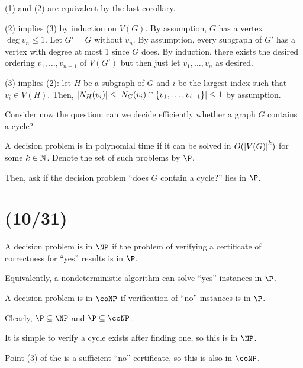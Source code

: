 \documentclass[class=math239,notes,tikz]{agony}
\begin{document}
\begin{prf}
  (1) and (2) are equivalent by the last corollary.

  (2) implies (3) by induction on $V(G)$.
  By assumption, $G$ has a vertex $\deg v_n \leq 1$.
  Let $G' = G$ without $v_n$.
  By assumption, every subgraph of $G'$ has a vertex with degree at most 1 since $G$ does.
  By induction, there exists the desired ordering $v_1,\dotsc,v_{n-1}$ of $V(G')$
  but then just let $v_1,\dotsc,v_n$ as desired.

  (3) implies (2): let $H$ be a subgraph of $G$
  and $i$ be the largest index such that $v_i \in V(H)$.
  Then, $\abs{N_H(v_i)} \leq \abs{N_G(v_i) \cap \{v_1,\dotsc,v_{i-1}\}} \leq 1$
  by assumption.
\end{prf}

Consider now the question: can we decide efficiently whether a graph $G$ contains a cycle?

\begin{defn}
  A decision problem is in polynomial time if it can be solved in
  $O(\abs{V(G)}^k)$ for some $k \in \mathbb{N}$.
  Denote the set of such problems by $\P$.
\end{defn}

Then, ask if the decision problem ``does $G$ contain a cycle?'' lies in $\P$.

\section{(10/31)}

\begin{defn}
  A decision problem is in $\NP$ if the problem of verifying
  a certificate of correctness for ``yes'' results is in $\P$.

  Equivalently, a nondeterministic algorithm can solve ``yes'' instances in $\P$.
\end{defn}
\begin{defn}
  A decision problem is in $\coNP$ if verification of ``no'' instances is in $\P$.
\end{defn}

\begin{remark}
  Clearly, $\P \subseteq \NP$ and $\P \subseteq \coNP$.
\end{remark}

It is simple to verify a cycle exists after finding one, so this is in $\NP$.

Point (3) of the  is a sufficient ``no'' certificate,
so this is also in $\coNP$.
\end{document}
